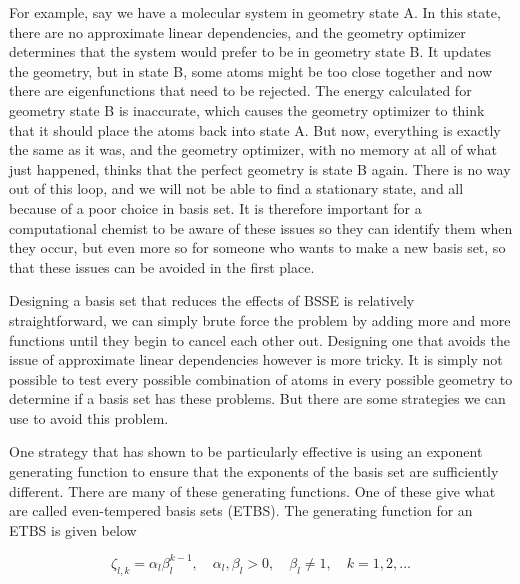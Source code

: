 For example, say we have a molecular system in geometry state A. In this state, there are no approximate linear dependencies, and the geometry optimizer determines that the system would prefer to be in geometry state B. It updates the geometry, but in state B, some atoms might be too close together and now there are eigenfunctions that need to be rejected. The energy calculated for geometry state B is inaccurate, which causes the geometry optimizer to think that it should place the atoms back into state A. But now, everything is exactly the same as it was, and the geometry optimizer, with no memory at all of what just happened, thinks that the perfect geometry is state B again. There is no way out of this loop, and we will not be able to find a stationary state, and all because of a poor choice in basis set. It is therefore important for a computational chemist to be aware of these issues so they can identify them when they occur, but even more so for someone who wants to make a new basis set, so that these issues can be avoided in the first place.

Designing a basis set that reduces the effects of BSSE is relatively straightforward, we can simply brute force the problem by adding more and more functions until they begin to cancel each other out. Designing one that avoids the issue of approximate linear dependencies however is more tricky. It is simply not possible to test every possible combination of atoms in every possible geometry to determine if a basis set has these problems. But there are some strategies we can use to avoid this problem.

One strategy that has shown to be particularly effective is using an exponent generating function to ensure that the exponents of the basis set are sufficiently different. There are many of these generating functions. One of these give what are called even-tempered basis sets (ETBS)\cite{ETBS}. The generating function for an ETBS is given below

\begin{equation}
\label{eq:ETBS_gen}
\zeta_{l,k} = \alpha_{l}\beta^{k-1}_{l}, \quad \alpha_{l}, \beta_{l} > 0, \quad \beta_{l} \neq 1, \quad k = 1, 2, \ldots
\end{equation}

